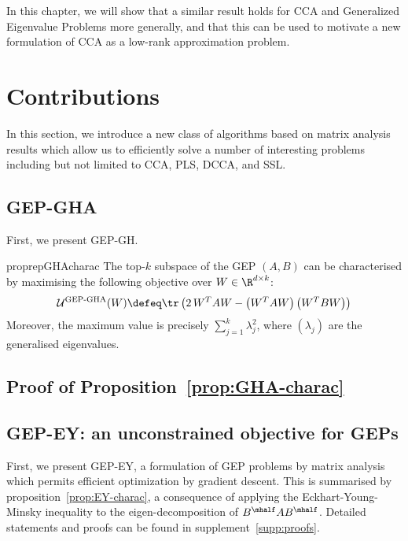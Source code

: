 In this chapter, we will show that a similar result holds for CCA and Generalized Eigenvalue Problems more generally, and that this can be used to motivate a new formulation of CCA as a low-rank approximation problem.


\section{Contributions}

In this section, we introduce a new class of algorithms based on matrix analysis results which allow us to efficiently solve a number of interesting problems including but not limited to CCA, PLS, DCCA, and SSL.

\subsection{GEP-GHA}
First, we present GEP-GH.

\begin{restatable}{proprep}{GHAcharac}
    \label{prop:GHA-charac}
    The top-$k$ subspace of the GEP $(A,B)$ can be characterised by maximising the following objective over $W \in \R^{d \times k}$:
    \begin{align}
        \mathcal{U}^\text{GEP-GHA}(W) \defeq \tr \left( 2\, W^T A W - \left(W^T A W\right) \left(W^T B W\right) \right)
    \end{align}
    Moreover, the maximum value is precisely $\sum_{j=1}^k \lambda_j^2$, where $(\lambda_j)$ are the generalised eigenvalues.
\end{restatable}

\subsection{Proof of Proposition~\ref{prop:GHA-charac}}

\subsection{GEP-EY: an unconstrained objective for GEPs}

First, we present GEP-EY, a formulation of GEP problems by matrix analysis which permits efficient optimization by gradient descent.
This is summarised by proposition~\ref{prop:EY-charac}, a consequence of applying the Eckhart-Young-Minsky inequality \citep{stewart_matrix_1990} to the eigen-decomposition of $B^\mhalf A B^\mhalf$. Detailed statements and proofs can be found in supplement~\ref{supp:proofs}.

